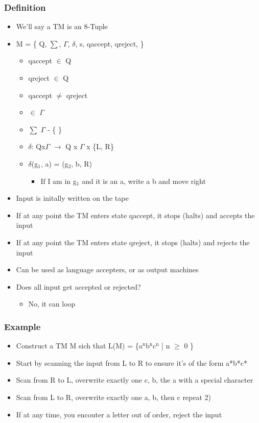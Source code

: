 \documentclass[11pt]{article}
\begin{document}
\subsubsection{Definition}
\label{sec:org275e1ab}
\begin{itemize}
\item We'll say a TM is an 8-Tuple
\item M = \{ Q, \(\sum\), \(\Gamma\), \(\delta\), s, qaccept, qreject, \square \}
\begin{itemize}
\item qaccept \(\in\) Q
\item qreject \(\in\) Q
\item qaccept \(\ne\) qreject
\item \square \(\in\) \(\Gamma\)
\item \(\sum\) \subseteq \(\Gamma\) - \{ \square \}
\item \(\delta\): Qx\(\Gamma\) \(\rightarrow\) Q x \(\Gamma\) x \{L, R\}
\item \(\delta\)(g\(_{\text{1}}\), a) = (g\(_{\text{2}}\), b, R)
\begin{itemize}
\item If I am in g\(_{\text{1}}\) and it is an a, write a b and move right
\end{itemize}
\end{itemize}
\item Input is initally written on the tape
\item If at any point the TM enters state qaccept, it stops (halts) and accepts the input
\item If at any point the TM enters state qreject, it stops (halts) and rejects the input
\item Can be used as language accepters, or as output machines
\item Does all input get accepted or rejected?
\begin{itemize}
\item No, it can loop
\end{itemize}
\end{itemize}
\subsubsection{Example}
\label{sec:orgb090561}
\begin{itemize}
\item Construct a TM M sich that L(M) = \{a\(^{\text{n}}\)b\(^{\text{n}}\)c\(^{\text{n}}\) | n \(\ge\) 0 \}
\item Start by scanning the input from L to R to ensure it's of the form a*b*c*
\item Scan from R to L, overwrite exactly one c, b, the a with a special character
\item Scan from L to R, overwrite exactly one a, b, then c repeat 2)
\item If at any time, you encouter a letter out of order, reject the input
\end{itemize}
\end{document}
